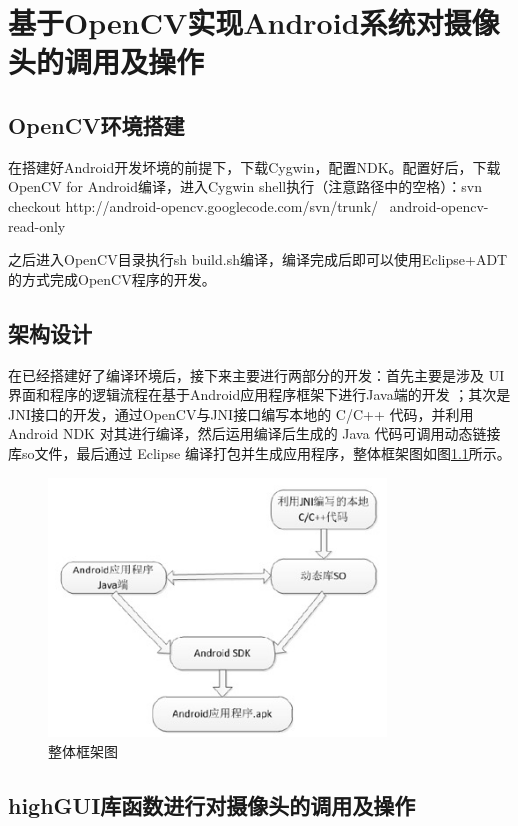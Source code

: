 \documentclass{XDBAthesis}
\begin{document}
\else
\fi
\chapter{基于OpenCV实现Android系统对摄像头的调用及操作}

\section{OpenCV环境搭建}

在搭建好Android开发坏境的前提下，下载Cygwin，配置NDK。配置好后，下载OpenCV for Android编译，进入Cygwin shell执行（注意路径中的空格）：svn checkout http://android-opencv.googlecode.com/svn/trunk/  android-opencv-read-only

    之后进入OpenCV目录执行sh build.sh编译，编译完成后即可以使用Eclipse+ADT的方式完成OpenCV程序的开发。

\section{架构设计}

    在已经搭建好了编译环境后，接下来主要进行两部分的开发：首先主要是涉及 UI 界面和程序的逻辑流程在基于Android应用程序框架下进行Java端的开发\cite{祝志远2015基于} ；其次是JNI接口的开发，通过OpenCV与JNI接口编写本地的 C/C++ 代码，并利用 Android NDK 对其进行编译，然后运用编译后生成的 Java 代码可调用动态链接库so文件，最后通过 Eclipse 编译打包并生成应用程序，整体框架图如图\ref{fg:whole}所示。
\begin{figure}[htb]
    \centering
    \includegraphics[width=0.8\textwidth]{figure/opencv}
    \caption{整体框架图}
    \label{fg:whole}
\end{figure}


\section{highGUI库函数进行对摄像头的调用及操作}
\end{document}
